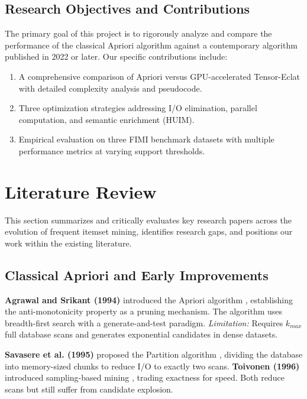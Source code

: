 \documentclass[conference]{IEEEtran}
\begin{document}
\subsection{Research Objectives and Contributions}
The primary goal of this project is to rigorously analyze and compare the performance of the classical Apriori algorithm against a contemporary algorithm published in 2022 or later. Our specific contributions include:
\begin{enumerate}
    \item A comprehensive comparison of Apriori versus GPU-accelerated Tensor-Eclat with detailed complexity analysis and pseudocode.
    \item Three optimization strategies addressing I/O elimination, parallel computation, and semantic enrichment (HUIM).
    \item Empirical evaluation on three FIMI benchmark datasets with multiple performance metrics at varying support thresholds.
\end{enumerate}

\section{Literature Review}

This section summarizes and critically evaluates key research papers across the evolution of frequent itemset mining, identifies research gaps, and positions our work within the existing literature.

\subsection{Classical Apriori and Early Improvements}
\textbf{Agrawal and Srikant (1994)} introduced the Apriori algorithm \cite{agrawal1994fast}, establishing the anti-monotonicity property as a pruning mechanism. The algorithm uses breadth-first search with a generate-and-test paradigm. \textit{Limitation:} Requires $k_{max}$ full database scans and generates exponential candidates in dense datasets.

\textbf{Savasere et al. (1995)} proposed the Partition algorithm \cite{savasere1995efficient}, dividing the database into memory-sized chunks to reduce I/O to exactly two scans. \textbf{Toivonen (1996)} introduced sampling-based mining \cite{toivonen1996sampling}, trading exactness for speed. Both reduce scans but still suffer from candidate explosion.
\end{document}
